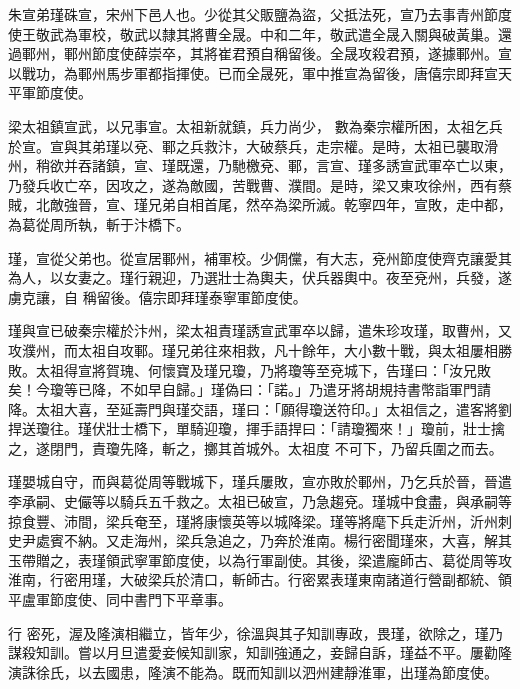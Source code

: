 
\begin{pinyinscope}

 朱宣弟瑾硃宣，宋州下邑人也。少從其父販鹽為盜，父抵法死，宣乃去事青州節度使王敬武為軍校，敬武以隸其將曹全晟。中和二年，敬武遣全晟入關與破黃巢。還過鄆州，鄆州節度使薛崇卒，其將崔君預自稱留後。全晟攻殺君預，遂據鄆州。宣以戰功，為鄆州馬步軍都指揮使。已而全晟死，軍中推宣為留後，唐僖宗即拜宣天平軍節度使。



 梁太祖鎮宣武，以兄事宣。太祖新就鎮，兵力尚少，
 數為秦宗權所困，太祖乞兵於宣。宣與其弟瑾以兗、鄆之兵救汴，大破蔡兵，走宗權。是時，太祖已襲取滑州，稍欲并吞諸鎮，宣、瑾既還，乃馳檄兗、鄆，言宣、瑾多誘宣武軍卒亡以東，乃發兵收亡卒，因攻之，遂為敵國，苦戰曹、濮間。是時，梁又東攻徐州，西有蔡賊，北敵強晉，宣、瑾兄弟自相首尾，然卒為梁所滅。乾寧四年，宣敗，走中都，為葛從周所執，斬于汴橋下。



 瑾，宣從父弟也。從宣居鄆州，補軍校。少倜儻，有大志，兗州節度使齊克讓愛其為人，以女妻之。瑾行親迎，乃選壯士為輿夫，伏兵器輿中。夜至兗州，兵發，遂虜克讓，自
 稱留後。僖宗即拜瑾泰寧軍節度使。



 瑾與宣已破秦宗權於汴州，梁太祖責瑾誘宣武軍卒以歸，遣朱珍攻瑾，取曹州，又攻濮州，而太祖自攻鄆。瑾兄弟往來相救，凡十餘年，大小數十戰，與太祖屢相勝敗。太祖得宣將賀瑰、何懷寶及瑾兄瓊，乃將瓊等至兗城下，告瑾曰：「汝兄敗矣！今瓊等已降，不如早自歸。」瑾偽曰：「諾。」乃遣牙將胡規持書幣詣軍門請降。太祖大喜，至延壽門與瑾交語，瑾曰：「願得瓊送符印。」太祖信之，遣客將劉捍送瓊往。瑾伏壯士橋下，單騎迎瓊，揮手語捍曰：「請瓊獨來！」瓊前，壯士擒之，遂閉門，責瓊先降，斬之，擲其首城外。太祖度
 不可下，乃留兵圍之而去。



 瑾嬰城自守，而與葛從周等戰城下，瑾兵屢敗，宣亦敗於鄆州，乃乞兵於晉，晉遣李承嗣、史儼等以騎兵五千救之。太祖已破宣，乃急趨兗。瑾城中食盡，與承嗣等掠食豐、沛間，梁兵奄至，瑾將康懷英等以城降梁。瑾等將麾下兵走沂州，沂州刺史尹處賓不納。又走海州，梁兵急追之，乃奔於淮南。楊行密聞瑾來，大喜，解其玉帶贈之，表瑾領武寧軍節度使，以為行軍副使。其後，梁遣龐師古、葛從周等攻淮南，行密用瑾，大破梁兵於清口，斬師古。行密累表瑾東南諸道行營副都統、領平盧軍節度使、同中書門下平章事。



 行
 密死，渥及隆演相繼立，皆年少，徐溫與其子知訓專政，畏瑾，欲除之，瑾乃謀殺知訓。嘗以月旦遣愛妾候知訓家，知訓強通之，妾歸自訴，瑾益不平。屢勸隆演誅徐氏，以去國患，隆演不能為。既而知訓以泗州建靜淮軍，出瑾為節度使。




\end{pinyinscope}
